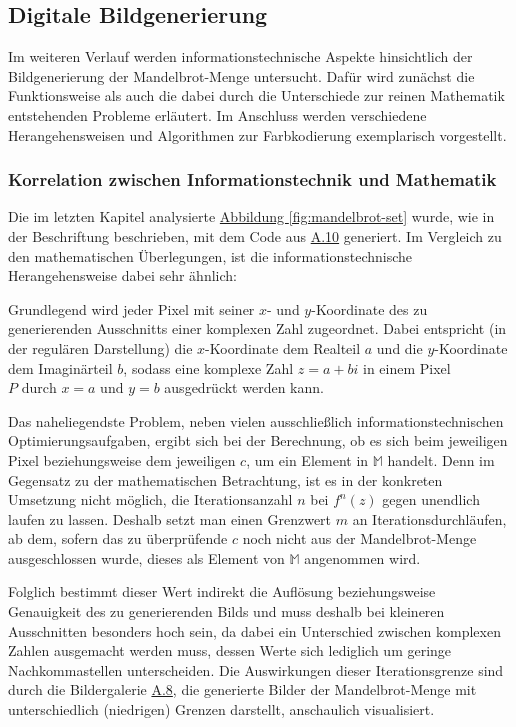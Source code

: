 \subsection{Digitale Bildgenerierung}\label{subsec:digital-generation}

Im weiteren Verlauf werden informationstechnische Aspekte
hinsichtlich der Bildgenerierung der Mandelbrot-Menge untersucht.
Dafür wird zunächst die Funktionsweise als auch die dabei durch die Unterschiede
zur reinen Mathematik entstehenden Probleme erläutert.
Im Anschluss werden verschiedene Herangehensweisen und Algorithmen zur Farbkodierung
exemplarisch vorgestellt.

\subsubsection{Korrelation zwischen Informationstechnik und Mathematik}
\label{subsubsec:correlation-between-it-and-mathematics}

Die im letzten Kapitel analysierte \hyperref[fig:mandelbrot-set]
{Abbildung \ref{fig:mandelbrot-set}} wurde,
wie in der Beschriftung beschrieben, mit dem Code aus \hyperref[app:10]{A.10}
generiert.
Im Vergleich zu den mathematischen Überlegungen, ist die
informationstechnische Herangehensweise dabei sehr ähnlich:

Grundlegend wird jeder Pixel mit seiner $x$- und $y$-Koordinate des zu generierenden
Ausschnitts einer komplexen Zahl zugeordnet.
Dabei entspricht (in der regulären Darstellung) die $x$-Koordinate dem Realteil
$a$ und die $y$-Koordinate dem Imaginärteil $b$, sodass eine komplexe Zahl
$z = a + bi$ in einem Pixel $P \text{ durch } x = a \text{ und } y = b$ ausgedrückt
werden kann.

Das naheliegendste Problem, neben vielen ausschließlich informationstechnischen
Optimierungsaufgaben, ergibt sich bei der Berechnung, ob es sich beim jeweiligen Pixel
beziehungsweise dem jeweiligen $c$, um ein Element in
$\mathbb{M}$ handelt.
Denn im Gegensatz zu der mathematischen Betrachtung, ist es in der konkreten Umsetzung
nicht möglich, die Iterationsanzahl $n$ bei $f^n(z)$ gegen unendlich laufen zu lassen.
Deshalb setzt man einen Grenzwert $m$ an Iterationsdurchläufen, ab dem,
sofern das zu überprüfende $c$ noch nicht aus der Mandelbrot-Menge
ausgeschlossen wurde, dieses als Element von $\mathbb{M}$ angenommen wird.

Folglich bestimmt dieser Wert indirekt die Auflösung beziehungsweise Genauigkeit
des zu generierenden Bilds und muss deshalb bei kleineren Ausschnitten besonders
hoch sein, da dabei ein Unterschied zwischen komplexen Zahlen ausgemacht werden
muss, dessen Werte sich lediglich um geringe Nachkommastellen unterscheiden.
Die Auswirkungen dieser Iterationsgrenze sind durch die Bildergalerie
\hyperref[app:8]{A.8}, die generierte Bilder der Mandelbrot-Menge
mit unterschiedlich (niedrigen) Grenzen darstellt, anschaulich visualisiert.

